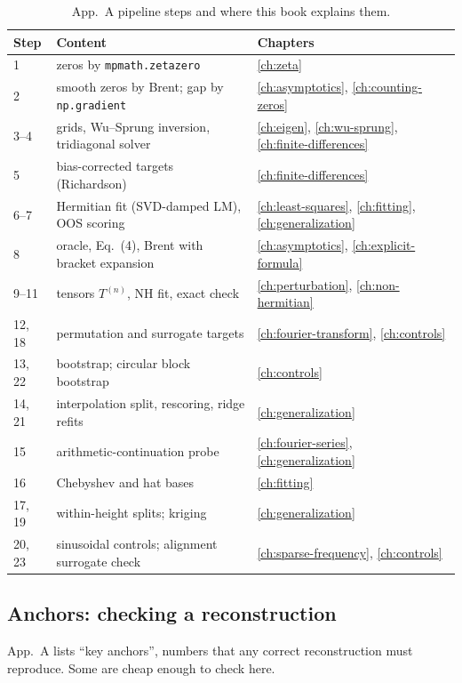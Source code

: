 \begin{table}[htbp]\centering\small
\caption{App.~A pipeline steps and where this book explains them.}
\label{tab:paper-critique-map}
\begin{tabular}{p{1.4cm}p{6.0cm}p{5.0cm}}
\toprule
Step & Content & Chapters \\
\midrule
1 & zeros by \texttt{mpmath.zetazero} & \ref{ch:zeta} \\
2 & smooth zeros by Brent; gap by \texttt{np.gradient} & \ref{ch:asymptotics}, \ref{ch:counting-zeros} \\
3--4 & grids, Wu--Sprung inversion, tridiagonal solver & \ref{ch:eigen}, \ref{ch:wu-sprung}, \ref{ch:finite-differences} \\
5 & bias-corrected targets (Richardson) & \ref{ch:finite-differences} \\
6--7 & Hermitian fit (SVD-damped LM), OOS scoring & \ref{ch:least-squares}, \ref{ch:fitting}, \ref{ch:generalization} \\
8 & oracle, Eq.~(4), Brent with bracket expansion & \ref{ch:asymptotics}, \ref{ch:explicit-formula} \\
9--11 & tensors $T^{(n)}$, NH fit, exact check & \ref{ch:perturbation}, \ref{ch:non-hermitian} \\
12, 18 & permutation and surrogate targets & \ref{ch:fourier-transform}, \ref{ch:controls} \\
13, 22 & bootstrap; circular block bootstrap & \ref{ch:controls} \\
14, 21 & interpolation split, rescoring, ridge refits & \ref{ch:generalization} \\
15 & arithmetic-continuation probe & \ref{ch:fourier-series}, \ref{ch:generalization} \\
16 & Chebyshev and hat bases & \ref{ch:fitting} \\
17, 19 & within-height splits; kriging & \ref{ch:generalization} \\
20, 23 & sinusoidal controls; alignment surrogate check & \ref{ch:sparse-frequency}, \ref{ch:controls} \\
\bottomrule
\end{tabular}
\end{table}

\subsection{Anchors: checking a reconstruction}

App.~A lists ``key anchors'', numbers that any correct reconstruction must reproduce. Some are cheap enough to check here.

